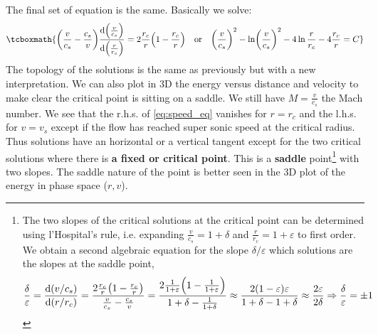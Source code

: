 \documentclass[10pt,a4paper,english]{article}
\let\originalleft\left
\let\originalright\right
\renewcommand{\left}{\mathopen{}\mathclose\bgroup\originalleft}
\renewcommand{\right}{\aftergroup\egroup\originalright}
\begin{document}
The final set of equation is the same. Basically we solve:
\begin{equation}
    \tcboxmath{
        \left( \frac{v}{c_s} - \frac{c_s}{v} \right) \frac{\d \left( \frac{v}{c_s} \right) }{\d \left( \frac{r}{r_c } \right) } = 2 \frac{r_c}{r} \left( 1 - \frac{r_c }{r} \right)\quad \textrm{or} \quad
        \left( \frac{v}{c_s} \right)^2 - \ln \left( \frac{v}{c_s} \right)^2 - 4\ln \frac{r}{r_c }- 4 \frac{r_c}{r} = C
    }
\end{equation}
The topology of the solutions is the same as previously but with a new interpretation. We can also plot in 3D the energy versus distance and velocity to make clear the critical point is sitting on a saddle. We still have $M = \frac{v}{c_s}$ the Mach number. We see that the r.h.s. of \eqref{eq:speed_eq} vanishes for $r=r_c$ and the l.h.s. for $v=v_s$ except if the flow has reached super sonic speed at the critical radius. Thus solutions have an horizontal or a vertical tangent except for the two critical solutions where there is \textbf{a fixed or critical point}. This is a \textbf{saddle} point\footnote{The two slopes of the critical solutions at the critical point can be determined using l'Hospital's rule, i.e. expanding $\frac{v}{c_s} = 1 + \delta$ and $\frac{r}{r_c} = 1 + \varepsilon$ to first order. We obtain a second algebraic equation for the slope $\delta/\varepsilon$ which solutions are the slopes at the saddle point,
    \begin{equation*}
        \frac{\delta}{\varepsilon} = \frac{\d (v/c_s)}{\d (r/r_c)} = \frac{2 \frac{r_c }{r}\left( 1 - \frac{r_c }{r} \right) }{\frac{v}{c_s} - \frac{c_s}{v}} = \frac{2 \frac{1}{1+\varepsilon} \left( 1 - \frac{1}{1+\varepsilon} \right) }{1 + \delta - \frac{1}{1+\delta}} \approx \frac{2(1-\varepsilon)\varepsilon}{1 + \delta - 1 + \delta} \approx \frac{2\varepsilon}{2\delta} \Rightarrow \frac{\delta}{\varepsilon} = \pm 1
\end{equation*}} with two slopes. The saddle nature of the point is better seen in the 3D plot of the energy in phase space ($r, v$).
\end{document}
